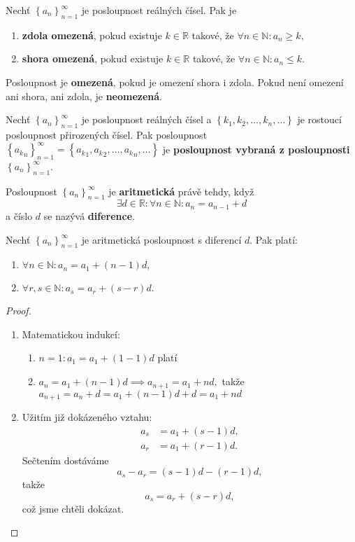 \begin{definition}
    Nechť $\left \{ a_n \right \}_{n=1}^\infty $ je posloupnost reálných čísel. Pak je
    \begin{enumerate}[$i.$]
    \item \textbf{zdola omezená}, pokud existuje $k\in \mathbb R$ takové, že
    $\forall n \in \mathbb N: a_n \geq k,$
   	\item \textbf{shora omezená}, pokud existuje $k\in \mathbb R$ takové, že
    $\forall n \in \mathbb N: a_n \leq k.$
    \end{enumerate}
    Posloupnost je \textbf{omezená}, pokud je omezení shora i zdola.
    Pokud není omezení ani shora, ani zdola, je \textbf{neomezená}.
\end{definition}

\begin{definition}
Nechť $\left \{ a_n \right \}_{n=1}^\infty $ je posloupnost reálných čísel a
$\left \{ k_1,k_2,\dots,k_n,\dots \right \} $ je rostoucí posloupnost přirozených čísel.
Pak posloupnost $\left \{{a_k}_n \right \}_{n=1}^\infty = \left \{ {a_k}_1, {a_k}_2, \dots, {a_k}_n,\dots \right \}  $
je \textbf{posloupnost vybraná z posloupnosti} $\left \{ a_n \right \}_{n=1}^\infty $.
\end{definition}

\begin{definition}
Posloupnost $\left \{ a_n \right \}_{n=1}^\infty $ je \textbf{aritmetická} právě
tehdy, když
$$\exists d \in \mathbb R: \forall n \in \mathbb N: a_n=a_{n-1}+d$$
a číslo $d$ se nazývá \textbf{diference}.
\end{definition}

\begin{veta}
    Nechť $\left \{ a_n \right \}_{n=1}^\infty $ je aritmetická posloupnost s diferencí
    $d$. Pak platí:
    \begin{enumerate}[$i.$]
    \item $\forall n\in \mathbb N: a_n = a_1 + (n-1)d,$
   	\item $\forall r,s \in \mathbb N: a_s = a_r + (s-r)d.$
    \end{enumerate}
\end{veta}

\begin{proof}
\begin{enumerate}[$i.$]
\item Matematickou indukcí:
\begin{enumerate}[1.]
\item $n=1: a_1 = a_1+(1-1)d$ platí
\item $a_n = a_1+(n-1)d \implies a_{n+1}=a_1+nd,$ takže $a_{n+1}=a_n+d=a_1+(n-1)d+d=a_1+nd$
\end{enumerate}
\item Užitím již dokázeného vztahu:
\begin{align*}
    a_s &= a_1 + (s-1)d,\\
    a_r &= a_1 + (r-1)d.
\end{align*}
Sečtením dostáváme
$$a_s-a_r = (s-1)d-(r-1)d,$$
takže
$$a_s=a_r+(s-r)d,$$
což jsme chtěli dokázat.\qedhere
\end{enumerate}
\end{proof}

